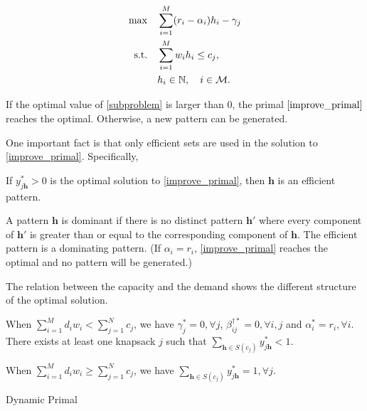 \begin{align}\label{subproblem}
    \max \quad & \sum_{i=1}^{M} (r_i - \alpha_{i}) h_{i} - \gamma_{j} \\
    \text {s.t.} \quad & \sum_{i= 1}^{M} w_{i} h_{i} \leq c_j, \notag \\
    & h_{i} \in \mathbb{N}, \quad i \in \mathcal{M}. \notag
\end{align} 

If the optimal value of \eqref{subproblem} is larger than $0$, the primal $\eqref{improve_primal}$ reaches the optimal. Otherwise, a new pattern can be generated.

One important fact is that only efficient sets are used in the solution to \eqref{improve_primal}. Specifically, 

\begin{lem}
    If $y_{j \bm{h}}^{*} > 0$ is the optimal solution to \eqref{improve_primal}, then $\bm{h}$ is an efficient pattern.
\end{lem}


A pattern $\bm{h}$ is dominant if there is no distinct pattern $\bm{h}{'}$ where every component of $\bm{h}{'}$ is greater than or equal to the corresponding component of $\bm{h}$. The efficient pattern is a dominating pattern. (If $\alpha_{i} = r_i$, \eqref{improve_primal} reaches the optimal and no pattern will be generated.)

The relation between the capacity and the demand shows the different structure of the optimal solution.

\begin{lem}
When $\sum_{i=1}^{M} d_{i} w_{i} < \sum_{j=1}^{N} c_{j}$, we have $\gamma_{j}^{*} =0, \forall j$, $\beta_{ij}^{\dag *} =0, \forall i,j$ and $\alpha^{*}_{i} = r_i, \forall i$. There exists at least one knapsack $j$ such that $\sum_{\bm{h} \in S(c_{j})} y_{j \bm{h}}^{*} < 1$.

When $\sum_{i=1}^{M} d_{i} w_{i} \geq \sum_{j=1}^{N} c_{j}$, we have $\sum_{\bm{h} \in S(c_{j})} y_{j \bm{h}}^{*} = 1, \forall j$.
\end{lem}


\begin{algorithm}[H]
    \caption{Dynamic Primal}\label{algo_improve_primal}
\end{algorithm}

